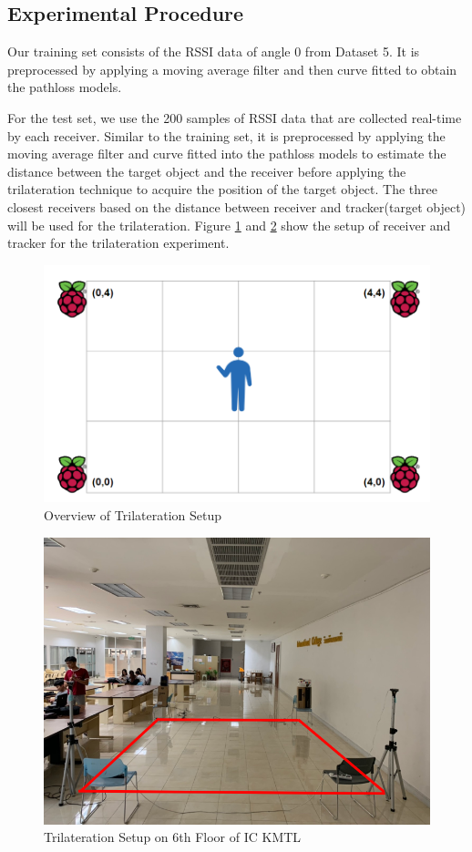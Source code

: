\subsection*{Experimental Procedure}
Our training set consists of the RSSI data of angle 0 from Dataset 5.
It is preprocessed by applying a moving average filter and then curve fitted
to obtain the pathloss models. 

For the test set, we use the 200 samples of RSSI data that are collected real-time
by each receiver. Similar to the training set, it is preprocessed by applying the 
moving average filter and curve fitted into the pathloss models to estimate
the distance between the target object and the receiver before applying the trilateration
technique to acquire the position of the target object. The three closest
receivers based on the distance between receiver and tracker(target object) will be
used for the trilateration. Figure \ref{fig:tri_setup} and \ref{fig:realtri_setup} show the setup of receiver and tracker
for the trilateration experiment.

\begin{figure}
\centering
\includegraphics[width=\textwidth]{Image/area.png}
\caption{Overview of Trilateration Setup}
\label{fig:tri_setup}
\end{figure}

\begin{figure}
\centering
\includegraphics[width=\textwidth]{Image/realarea.png}
\caption{Trilateration Setup on 6th Floor of IC KMTL }
\label{fig:realtri_setup}
\end{figure}

